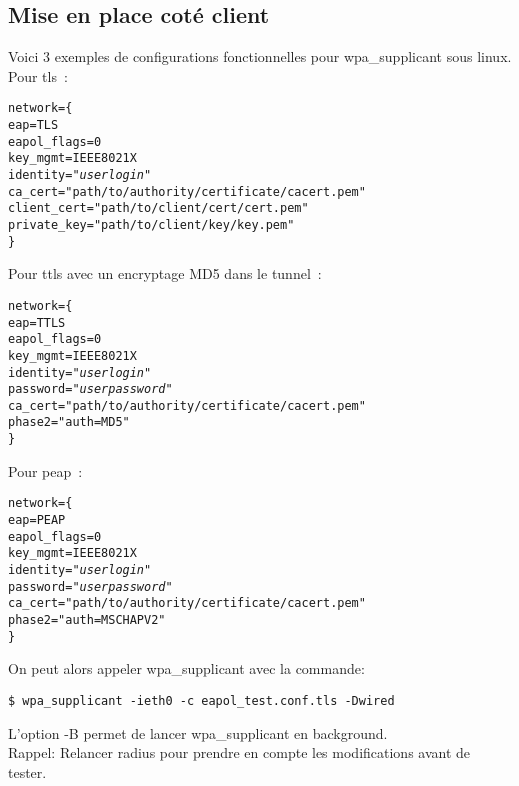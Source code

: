 \subsection{Mise en place coté client}
Voici 3 exemples de configurations fonctionnelles pour wpa\_supplicant sous linux. 
Pour tls~:
\begin{alltt}
network=\{
    eap=TLS
    eapol_flags=0
    key_mgmt=IEEE8021X
    identity="\textit{userlogin}"
    ca_cert="path/to/authority/certificate/cacert.pem"
    client_cert="path/to/client/cert/cert.pem"
    private_key="path/to/client/key/key.pem"
\}
\end{alltt}
Pour ttls avec un encryptage MD5 dans le tunnel~:
\begin{alltt}
network=\{
    eap=TTLS
    eapol_flags=0
    key_mgmt=IEEE8021X
    identity="\textit{userlogin}"
    password="\textit{userpassword}"
    ca_cert="path/to/authority/certificate/cacert.pem"
    phase2="auth=MD5"
\}
\end{alltt}
Pour peap~:
\begin{alltt}
network=\{
    eap=PEAP
    eapol_flags=0
    key_mgmt=IEEE8021X
    identity="\textit{userlogin}"
    password="\textit{userpassword}"
    ca_cert="path/to/authority/certificate/cacert.pem"
    phase2="auth=MSCHAPV2"
\}
\end{alltt}

On peut alors appeler wpa\_supplicant avec la commande:
\begin{verbatim}
$ wpa_supplicant -ieth0 -c eapol_test.conf.tls -Dwired
\end{verbatim}
L'option -B permet de lancer wpa\_supplicant en background.\\
Rappel: Relancer radius pour prendre en compte les modifications avant de tester.








